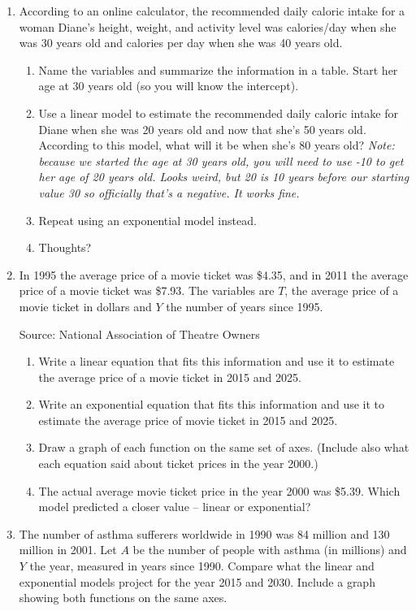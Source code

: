 \begin{enumerate}
\item According to an online calculator, the recommended daily caloric intake for a woman Diane's height, weight, and activity level was  calories/day when she was 30 years old and  calories per day when she was 40 years old.
\begin{enumerate}
\item Name the variables and summarize the information in a table.  Start her age at 30 years old (so you will know the intercept).
\item Use a linear model to estimate the recommended daily caloric intake for Diane when she was 20 years old and now that she's 50 years old.  According to this model, what will it be when she's 80 years old? \emph{Note:  because we started the age at 30 years old, you will need to use -10 to get her age of 20 years old.  Looks weird, but 20 is 10 years before our starting value 30 so officially that's a negative.  It works fine.}
\item Repeat using an exponential model instead.
\item Thoughts?
\end{enumerate}

\item In 1995 the average price of a movie ticket was \$4.35, and in 2011 the average price of a movie ticket was \$7.93.  The variables are $T$, the average price of a movie ticket in dollars and $Y$ the number of years since 1995.  

\hfill \begin{footnotesize} Source: National Association of Theatre Owners \end{footnotesize}
\begin{enumerate}
\item Write a linear equation that fits this information and use it to estimate the average price of a movie ticket in 2015 and 2025.
\item Write an exponential equation that fits this information and use it to estimate the average price of movie ticket in 2015 and 2025.
\item Draw a graph of each function on the same set of axes.  (Include also what each equation said about ticket prices in the year 2000.)
\item The actual average movie ticket price in the year 2000 was \$5.39.  Which model predicted a closer value -- linear or exponential?
\end{enumerate}

\item The number of asthma sufferers worldwide in 1990 was 84 million and 130 million in 2001.  Let $A$ be the number of people with asthma (in millions) and $Y$ the year, measured in years since 1990.  Compare what the linear and exponential models project for the year 2015 and 2030.  Include a graph showing both functions on the same axes.


\end{enumerate}
